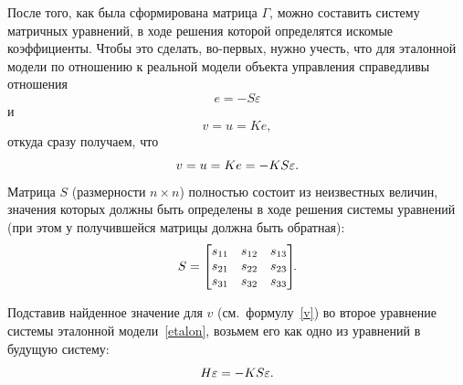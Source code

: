 \documentclass[12pt,a4paper,openany]{extarticle}
\begin{document}
После того, как была сформирована матрица $\varGamma\!$, можно составить систему матричных уравнений, в ходе решения которой определятся искомые коэффициенты. 
Чтобы это сделать, во-первых, нужно учесть, что для эталонной модели по отношению к реальной модели объекта управления справедливы отношения
\begin{equation}\label{e}
	e = -S\varepsilon
\end{equation}
и
\begin{equation}
	v = u = Ke,
\end{equation}
откуда сразу получаем, что 
\begin{equation}\label{v}
	v=u=Ke=-KS\varepsilon\ldotp
\end{equation}
Матрица $S$ (размерности $n \times n$) полностью состоит из неизвестных величин, значения которых должны быть определены в ходе решения системы уравнений (при этом у получившейся матрицы должна быть обратная):
\begin{equation}
	S =
	\begin{bmatrix}
		s_{11} & s_{12} & s_{13} \\
		s_{21} & s_{22} & s_{23} \\
		s_{31} & s_{32} & s_{33}
	\end{bmatrix}\!\!\ldotp
\end{equation}

Подставив найденное значение для $v$ (см.~формулу~\eqref{v}) во второе уравнение системы эталонной модели~\eqref{etalon}, возьмем его как одно из уравнений в будущую систему:
\begin{equation}
	H\varepsilon = -KS\varepsilon\ldotp
\end{equation}
\end{document}
